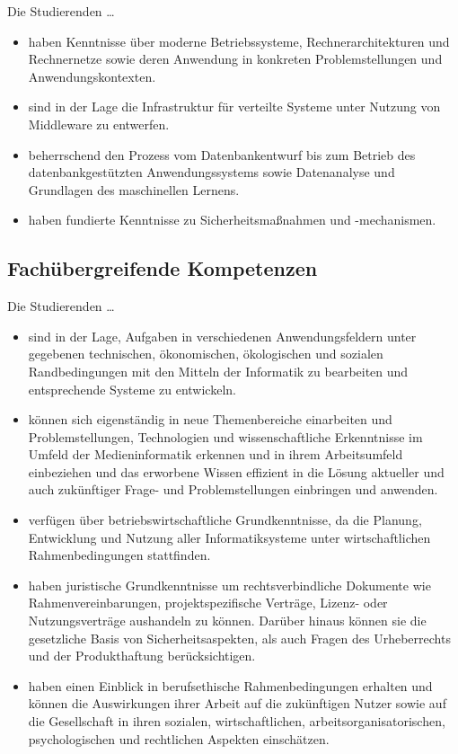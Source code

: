 Die Studierenden \ldots{}

\begin{itemize}
\tightlist
\item
  haben Kenntnisse über moderne Betriebssysteme, Rechnerarchitekturen
  und Rechnernetze sowie deren Anwendung in konkreten Problemstellungen
  und Anwendungskontexten.
\item
  sind in der Lage die Infrastruktur für verteilte Systeme unter Nutzung
  von Middleware zu entwerfen.
\item
  beherrschend den Prozess vom Datenbankentwurf bis zum Betrieb des
  datenbankgestützten Anwendungssystems sowie Datenanalyse und
  Grundlagen des maschinellen Lernens.
\item
  haben fundierte Kenntnisse zu Sicherheitsmaßnahmen und -mechanismen.
\end{itemize}

\subsection{Fachübergreifende
Kompetenzen}\label{fachuxfcbergreifende-kompetenzen}

Die Studierenden \ldots{}

\begin{itemize}
\tightlist
\item
  sind in der Lage, Aufgaben in verschiedenen Anwendungsfeldern unter
  gegebenen technischen, ökonomischen, ökologischen und sozialen
  Randbedingungen mit den Mitteln der Informatik zu bearbeiten und
  entsprechende Systeme zu entwickeln.
\item
  können sich eigenständig in neue Themenbereiche einarbeiten und
  Problemstellungen, Technologien und wissenschaftliche Erkenntnisse im
  Umfeld der Medieninformatik erkennen und in ihrem Arbeitsumfeld
  einbeziehen und das erworbene Wissen effizient in die Lösung aktueller
  und auch zukünftiger Frage- und Problemstellungen einbringen und
  anwenden.
\item
  verfügen über betriebswirtschaftliche Grundkenntnisse, da die Planung,
  Entwicklung und Nutzung aller Informatiksysteme unter wirtschaftlichen
  Rahmenbedingungen stattfinden.
\item
  haben juristische Grundkenntnisse um rechtsverbindliche Dokumente wie
  Rahmenvereinbarungen, projektspezifische Verträge, Lizenz- oder
  Nutzungsverträge aushandeln zu können. Darüber hinaus können sie die
  gesetzliche Basis von Sicherheitsaspekten, als auch Fragen des
  Urheberrechts und der Produkthaftung berücksichtigen.
\item
  haben einen Einblick in berufsethische Rahmenbedingungen erhalten und
  können die Auswirkungen ihrer Arbeit auf die zukünftigen Nutzer sowie
  auf die Gesellschaft in ihren sozialen, wirtschaftlichen,
  arbeitsorganisatorischen, psychologischen und rechtlichen Aspekten
  einschätzen.
\end{itemize}

